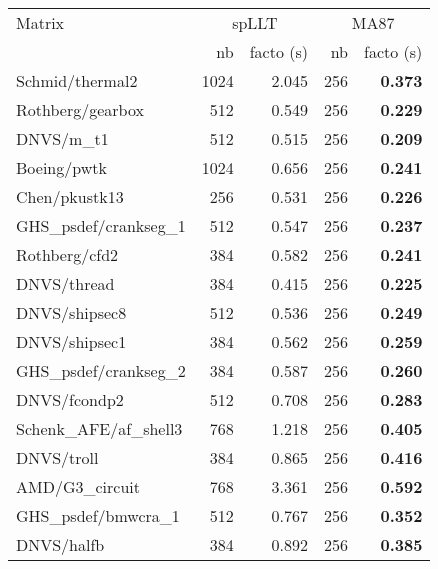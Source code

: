 \begin{tabular}{l|rr|rr}
  \hline
  Matrix                          & \multicolumn{2}{c}{spLLT} & \multicolumn{2}{c}{MA87}     \\
  \cline{2-5}
                                  & nb                        & facto (s) & nb  & facto (s)  \\
  \cline{2-5}
  Schmid/thermal2                 & 1024                      & 2.045     & 256 & \bf 0.373  \\
  Rothberg/gearbox                & 512                       & 0.549     & 256 & \bf 0.229  \\
  DNVS/m\_t1                      & 512                       & 0.515     & 256 & \bf 0.209  \\
  Boeing/pwtk                     & 1024                      & 0.656     & 256 & \bf 0.241  \\
  Chen/pkustk13                   & 256                       & 0.531     & 256 & \bf 0.226  \\
  GHS\_psdef/crankseg\_1          & 512                       & 0.547     & 256 & \bf 0.237  \\
  Rothberg/cfd2                   & 384                       & 0.582     & 256 & \bf 0.241  \\
  DNVS/thread                     & 384                       & 0.415     & 256 & \bf 0.225  \\
  DNVS/shipsec8                   & 512                       & 0.536     & 256 & \bf 0.249  \\
  DNVS/shipsec1                   & 384                       & 0.562     & 256 & \bf 0.259  \\
  GHS\_psdef/crankseg\_2          & 384                       & 0.587     & 256 & \bf 0.260  \\
  DNVS/fcondp2                    & 512                       & 0.708     & 256 & \bf 0.283  \\
  Schenk\_AFE/af\_shell3          & 768                       & 1.218     & 256 & \bf 0.405  \\
  DNVS/troll                      & 384                       & 0.865     & 256 & \bf 0.416  \\
  AMD/G3\_circuit                 & 768                       & 3.361     & 256 & \bf 0.592  \\
  GHS\_psdef/bmwcra\_1            & 512                       & 0.767     & 256 & \bf 0.352  \\
  DNVS/halfb                      & 384                       & 0.892     & 256 & \bf 0.385  \\

\end{tabular}
